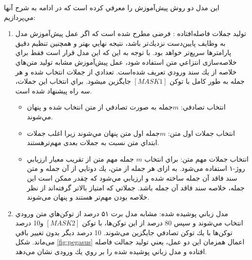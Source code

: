 این مدل دو روش پيش‌آموزش را معرفي كرده است كه در ادامه به شرح آنها مي‌پردازيم:
\begin{enumerate}
	\item {
		توليد جملات فاصله‌افتاده : فرضی مطرح شده است كه اگر عمل پيش‌آموزش مدل به وظایف
		پايين‌دست
		نزديك‌تر باشد، نتیجه نهايي بهتر و همچنين تنظیم دقیق پارامترها
		سريع‌تر خواهد بود. با توجه به اين كه اين مدل قرار است فقط براي خلاصه‌سازی انتزاعي متن استفاده شود، عمل
		پيش‌آموزش مشابه توليد متن‌هاي خلاصه از يك سند ورودي تعریف شده‌است. تعدادي از جملات انتخاب شده و هر جمله
		به طور كامل با توكن $ [MASK1] $ جايگزين ميشود. براي انتخاب اين جملات، سه راه پيشنهاد
		شده است.
		\begin{itemize}
			\item {
				انتخاب تصادفي: $ m $جمله به صورت تصادفي از متن انتخاب شده و پنهان مي‌شوند.
			}
			\item{
				انتخاب جملات اول متن: $ m $جمله اول متن پنهان مي‌شوند زیرا اغلب جملات ابتداي متن نسبت به جملات بعدی مهم‌ترهستند.
			}
			\item{
				انتخاب جملات مهم متن: براي انتخاب $ m $ جمله مهم متن از تقريب معيار ارزيابي روژ-۱
				استفاده می‌شود. به ازای هر
				جمله از متن، يك دوتايي از آن جمله و متن سند فاقد آن جمله ساخته شده و ارزيابي
				مي‌شود كه چقدر ممکن است اين جمله، خلاصه سند فاقد آن جمله باشد. جملاتي
				كه امتیاز بالاتر گرفته‌اند از نظر خلاصه بودن مهم‌تر هستند و پنهان می‌شوند.
			}
			
			
		\end{itemize}
	}
	\item{
		 مدل زباني پوشيده شده: مشابه مدل برت ۵۱ درصد از توكن‌هاي متن ورودي انتخاب
		مي‌شوند و سپس 80 درصد از اين توكن‌ها، با توكن $ [MASK2] $ و10 درصد توكن‌ها با يك توكن
		تصادفي جايگزين می‌شوند. 10 درصد ديگر بدون تغيير باقي می‌ماند.
		شكل \ref{fig:pegasus} اعمال همزمان اين دو عمل، يعني توليد جمالت فاصله افتاده و مدل زباني پوشيده شده
		را بر روي يك ورودی نشان می‌دهد.
	}
\end{enumerate}

